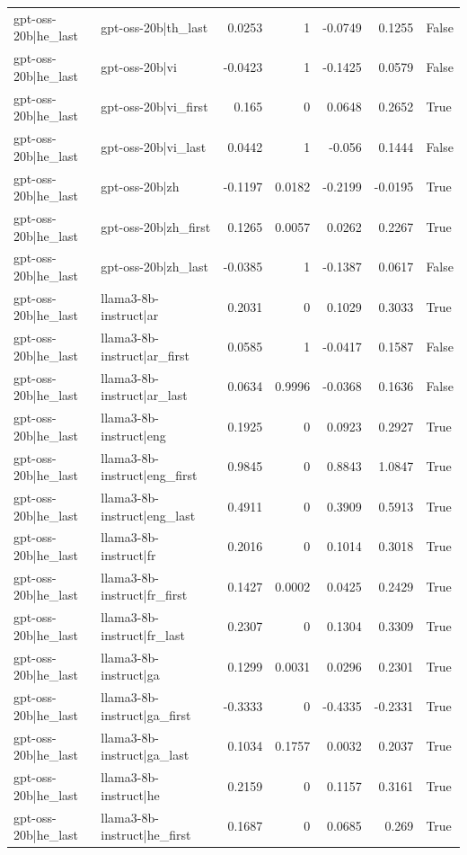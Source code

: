 \begin{table}
\begin{tabular}{l l r r r r l}
gpt-oss-20b|he_last & gpt-oss-20b|th_last & 0.0253 & 1 & -0.0749 & 0.1255 & False \\
gpt-oss-20b|he_last & gpt-oss-20b|vi & -0.0423 & 1 & -0.1425 & 0.0579 & False \\
gpt-oss-20b|he_last & gpt-oss-20b|vi_first & 0.165 & 0 & 0.0648 & 0.2652 & True \\
gpt-oss-20b|he_last & gpt-oss-20b|vi_last & 0.0442 & 1 & -0.056 & 0.1444 & False \\
gpt-oss-20b|he_last & gpt-oss-20b|zh & -0.1197 & 0.0182 & -0.2199 & -0.0195 & True \\
gpt-oss-20b|he_last & gpt-oss-20b|zh_first & 0.1265 & 0.0057 & 0.0262 & 0.2267 & True \\
gpt-oss-20b|he_last & gpt-oss-20b|zh_last & -0.0385 & 1 & -0.1387 & 0.0617 & False \\
gpt-oss-20b|he_last & llama3-8b-instruct|ar & 0.2031 & 0 & 0.1029 & 0.3033 & True \\
gpt-oss-20b|he_last & llama3-8b-instruct|ar_first & 0.0585 & 1 & -0.0417 & 0.1587 & False \\
gpt-oss-20b|he_last & llama3-8b-instruct|ar_last & 0.0634 & 0.9996 & -0.0368 & 0.1636 & False \\
gpt-oss-20b|he_last & llama3-8b-instruct|eng & 0.1925 & 0 & 0.0923 & 0.2927 & True \\
gpt-oss-20b|he_last & llama3-8b-instruct|eng_first & 0.9845 & 0 & 0.8843 & 1.0847 & True \\
gpt-oss-20b|he_last & llama3-8b-instruct|eng_last & 0.4911 & 0 & 0.3909 & 0.5913 & True \\
gpt-oss-20b|he_last & llama3-8b-instruct|fr & 0.2016 & 0 & 0.1014 & 0.3018 & True \\
gpt-oss-20b|he_last & llama3-8b-instruct|fr_first & 0.1427 & 0.0002 & 0.0425 & 0.2429 & True \\
gpt-oss-20b|he_last & llama3-8b-instruct|fr_last & 0.2307 & 0 & 0.1304 & 0.3309 & True \\
gpt-oss-20b|he_last & llama3-8b-instruct|ga & 0.1299 & 0.0031 & 0.0296 & 0.2301 & True \\
gpt-oss-20b|he_last & llama3-8b-instruct|ga_first & -0.3333 & 0 & -0.4335 & -0.2331 & True \\
gpt-oss-20b|he_last & llama3-8b-instruct|ga_last & 0.1034 & 0.1757 & 0.0032 & 0.2037 & True \\
gpt-oss-20b|he_last & llama3-8b-instruct|he & 0.2159 & 0 & 0.1157 & 0.3161 & True \\
gpt-oss-20b|he_last & llama3-8b-instruct|he_first & 0.1687 & 0 & 0.0685 & 0.269 & True \\

\end{tabular}
\end{table}
